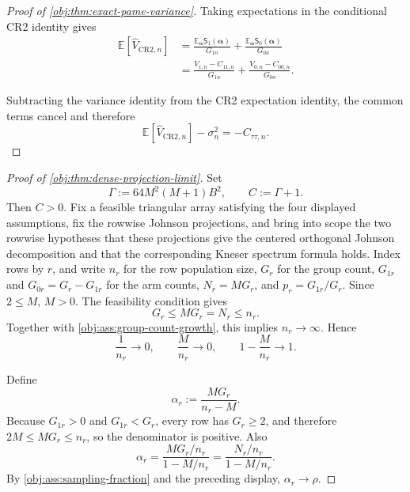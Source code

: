 \documentclass[11pt]{article}
\begin{document}
\begin{proof}[Proof of \cref{obj:thm:exact-pame-variance}]
Taking expectations in the conditional CR2 identity gives
\[
\begin{aligned}
\mathbb E[\widehat V_{\mathrm{CR2},n}]
&=
\frac{\mathbb E_{\boldsymbol\alpha}\mathsf S_1(\boldsymbol\alpha)}{G_{1n}}
+
\frac{\mathbb E_{\boldsymbol\alpha}\mathsf S_0(\boldsymbol\alpha)}{G_{0n}} \\
&=
\frac{V_{1,n}-C_{11,n}}{G_{1n}}
+
\frac{V_{0,n}-C_{00,n}}{G_{0n}} .
\end{aligned}
\]

Subtracting the variance identity from the CR2 expectation identity, the common terms cancel and therefore
\[
\mathbb E[\widehat V_{\mathrm{CR2},n}]-\sigma_n^2
=
-C_{\tau\tau,n}.
\]
\end{proof}

\begin{proof}[Proof of \cref{obj:thm:dense-projection-limit}]
Set
\[
\Gamma:=64M^2(M+1)B^2,
\qquad
C:=\Gamma+1 .
\]
Then \(C>0\).  Fix a feasible triangular array satisfying the four displayed assumptions, fix the rowwise Johnson projections, and bring into scope the two rowwise hypotheses that these projections give the centered orthogonal Johnson decomposition and that the corresponding Kneser spectrum formula holds.  Index rows by \(r\), and write \(n_r\) for the row population size, \(G_r\) for the group count, \(G_{1r}\) and \(G_{0r}=G_r-G_{1r}\) for the arm counts, \(N_r=MG_r\), and \(p_r=G_{1r}/G_r\).  Since \(2\le M\), \(M>0\).  The feasibility condition gives
\[
G_r\le MG_r=N_r\le n_r .
\]
Together with \cref{obj:ass:group-count-growth}, this implies \(n_r\to\infty\).  Hence
\[
\frac1{n_r}\to0,\qquad
\frac{M}{n_r}\to0,\qquad
1-\frac{M}{n_r}\to1 .
\]

Define
\[
\alpha_r:=\frac{MG_r}{n_r-M}.
\]
Because \(G_{1r}>0\) and \(G_{1r}<G_r\), every row has \(G_r\ge2\), and therefore \(2M\le MG_r\le n_r\), so the denominator is positive.  Also
\[
\alpha_r
=
\frac{MG_r/n_r}{1-M/n_r}
=
\frac{N_r/n_r}{1-M/n_r}.
\]
By \cref{obj:ass:sampling-fraction} and the preceding display, \(\alpha_r\to\rho\).


\end{proof}
\end{document}

